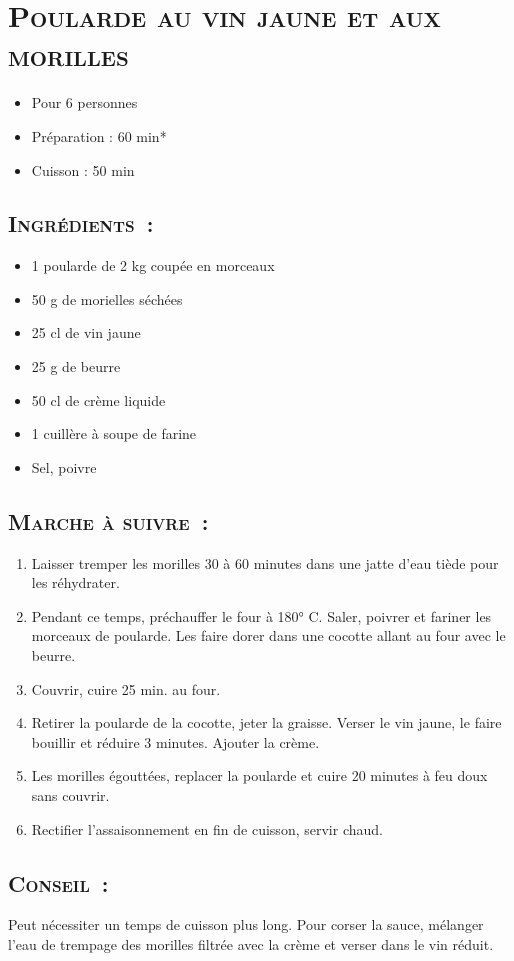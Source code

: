 \section[\normalsize{Poularde au vin jaune et aux morilles}]{\LARGE{\textsc{Poularde au vin jaune et aux morilles}}}		%


\begin{itemize}
\item Pour 6 personnes
\item Préparation : 60 min*
\item Cuisson : 50 min
\end{itemize}

\subsection*{\textsc{Ingr\'edients~:}}

\begin{itemize}
\item 1 poularde de 2 kg coup\'ee en morceaux
\item 50 g de morielles s\'ech\'ees
\item 25 cl de vin jaune
\item 25 g de beurre
\item 50 cl de cr\`eme liquide
\item 1 cuill\`ere \`a soupe de farine
\item Sel, poivre
\end{itemize}


\subsection*{\textsc{Marche \`a suivre~:}}

\begin{enumerate}
\item Laisser tremper les morilles 30 \`a 60 minutes dans une jatte d'eau ti\`ede pour les r\'ehydrater.
\item Pendant ce temps, pr\'echauffer le four \`a 180° C. Saler, poivrer et fariner les morceaux de poularde. Les faire dorer dans une cocotte allant au four avec le beurre. 
\item Couvrir, cuire 25 min. au four.
\item Retirer la poularde de la cocotte, jeter la graisse. Verser le vin jaune, le faire bouillir et r\'eduire 3 minutes. Ajouter la cr\`eme.
\item Les morilles \'egoutt\'ees, replacer la poularde et cuire 20 minutes \`a feu doux sans couvrir. 
\item Rectifier l'assaisonnement en fin de cuisson, servir chaud. 
\end{enumerate}
\subsection*{\textsc{Conseil~:}}

Peut n\'ecessiter un temps de cuisson plus long. Pour corser la sauce, m\'elanger l'eau de trempage des morilles filtr\'ee avec la cr\`eme et verser dans le vin r\'eduit.